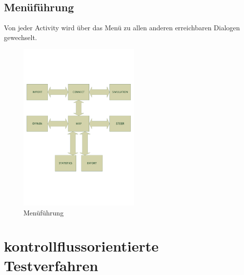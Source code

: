 \documentclass[10pt,a4paper]{article}
\begin{document}
		\subsection{Men\"uf\"uhrung}
			Von jeder Activity wird \"uber das Men\"u zu allen anderen erreichbaren Dialogen gewechselt.
		\begin{figure}[htbp]
		\centering
			\includegraphics[width = 6cm]{images/Zeichnung1}
			\caption{Men\"uf\"uhrung}
		\end{figure}
		
	\section{kontrollflussorientierte Testverfahren}

				 			
\end{document}
